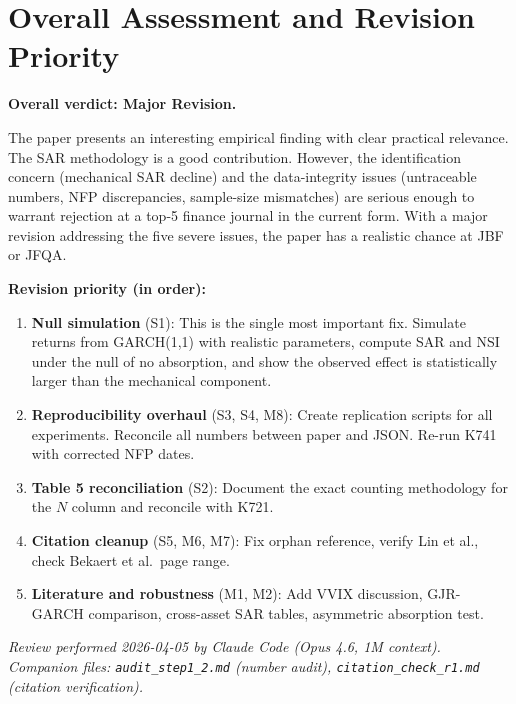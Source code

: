 \documentclass[12pt,a4paper]{article}
\begin{document}
\section*{Overall Assessment and Revision Priority}

\textbf{Overall verdict: Major Revision.}

The paper presents an interesting empirical finding with clear practical relevance.  The SAR methodology is a good contribution.  However, the identification concern (mechanical SAR decline) and the data-integrity issues (untraceable numbers, NFP discrepancies, sample-size mismatches) are serious enough to warrant rejection at a top-5 finance journal in the current form.  With a major revision addressing the five severe issues, the paper has a realistic chance at JBF or JFQA.

\bigskip

\textbf{Revision priority (in order):}
\begin{enumerate}
  \item \textbf{Null simulation} (S1): This is the single most important fix.  Simulate returns from GARCH(1,1) with realistic parameters, compute SAR and NSI under the null of no absorption, and show the observed effect is statistically larger than the mechanical component.
  \item \textbf{Reproducibility overhaul} (S3, S4, M8): Create replication scripts for all experiments.  Reconcile all numbers between paper and JSON.  Re-run K741 with corrected NFP dates.
  \item \textbf{Table 5 reconciliation} (S2): Document the exact counting methodology for the $N$ column and reconcile with K721.
  \item \textbf{Citation cleanup} (S5, M6, M7): Fix orphan reference, verify Lin et al., check Bekaert et al.\ page range.
  \item \textbf{Literature and robustness} (M1, M2): Add VVIX discussion, GJR-GARCH comparison, cross-asset SAR tables, asymmetric absorption test.
\end{enumerate}

\bigskip

\noindent\textit{Review performed 2026-04-05 by Claude Code (Opus 4.6, 1M context).}\\
\noindent\textit{Companion files: \texttt{audit\_step1\_2.md} (number audit), \texttt{citation\_check\_r1.md} (citation verification).}
\end{document}

